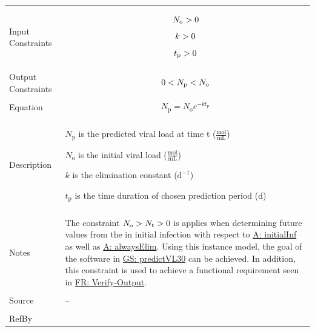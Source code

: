 \documentclass[12pt]{article}
\newcommand{\gt}{\ensuremath >}
\newcommand{\lt}{\ensuremath <}
\begin{document}
\begin{minipage}{\textwidth}
\begin{tabular}{>{\raggedright}p{}>{\raggedright\arraybackslash}p{}}
\\ \midrule \\
Input Constraints & \begin{displaymath}
                    {N_{\text{o}}}\gt{}0
                    \end{displaymath}
                    \begin{displaymath}
                    k\gt{}0
                    \end{displaymath}
                    \begin{displaymath}
                    {t_{\text{p}}}\gt{}0
                    \end{displaymath}
\\ \midrule \\
Output Constraints & \begin{displaymath}
                     0\lt{}{N_{\text{p}}}\lt{}{N_{\text{o}}}
                     \end{displaymath}
\\ \midrule \\
Equation & \begin{displaymath}
           {N_{\text{p}}}={N_{\text{o}}} e^{-k {t_{\text{p}}}}
           \end{displaymath}
\\ \midrule \\
Description & \begin{symbDescription}
              \item{${N_{\text{p}}}$ is the predicted viral load at time t ($\frac{\text{mol}}{\text{mL}}$)}
              \item{${N_{\text{o}}}$ is the initial viral load ($\frac{\text{mol}}{\text{mL}}$)}
              \item{$k$ is the elimination constant ($\text{d}^{-1}$)}
              \item{${t_{\text{p}}}$ is the time duration of chosen prediction period (${\text{d}}$)}
              \end{symbDescription}
\\ \midrule \\
Notes & The constraint ${N_{\text{o}}}\gt{}{N_{\text{t}}}\gt{}0$ is  applies when determining future values from the in initial infection with respect to \hyperref[initialInf]{A: initialInf} as well as  \hyperref[alwaysElim]{A: alwaysElim}. Using this instance model, the goal of the software in  \hyperref[predictVL30]{GS: predictVL30}  can be achieved. In addition, this constraint is used to achieve a functional requirement seen in  \hyperref[verifyOutput]{FR: Verify-Output}.
        
\\ \midrule \\
Source & --
         
\\ \midrule \\
RefBy & 
\\ \bottomrule
\end{tabular}
\end{minipage}
\end{document}
